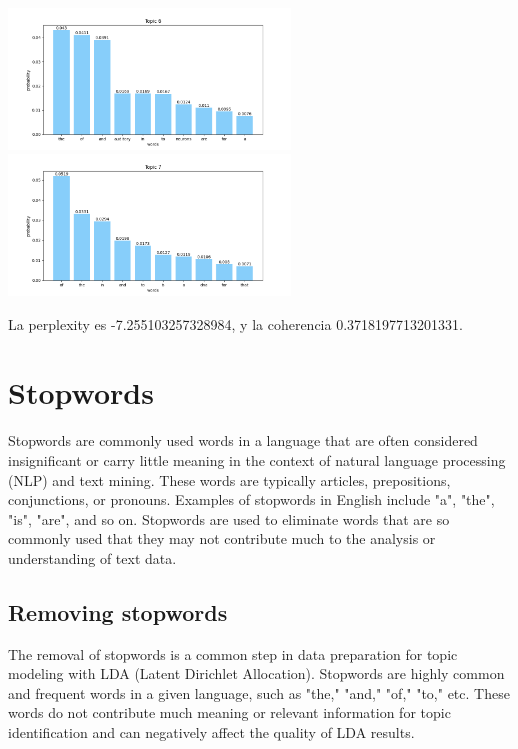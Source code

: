 \documentclass[10pt]{article} %
\begin{document}
\begin{center}
		\includegraphics[width=7.5cm]{images/plots/test_8/topic_6.png}
		\includegraphics[width=7.5cm]{images/plots/test_8/topic_7.png}
	\end{center}

		
	La perplexity es -7.255103257328984, y la coherencia  0.3718197713201331.
	
	\section{Stopwords}
	Stopwords are commonly used words in a language that are often considered insignificant or carry little meaning in the context of natural language processing (NLP) and text mining. These words are typically articles, prepositions, conjunctions, or pronouns. Examples of stopwords in English include "a", "the", "is", "are", and so on. Stopwords are used to eliminate words that are so commonly used that they may not contribute much to the analysis or understanding of text data.
	
	\subsection{Removing stopwords}
	
	The removal of stopwords is a common step in data preparation for topic modeling with LDA (Latent Dirichlet Allocation). Stopwords are highly common and frequent words in a given language, such as "the," "and," "of," "to," etc. These words do not contribute much meaning or relevant information for topic identification and can negatively affect the quality of LDA results.
	
\end{document}
